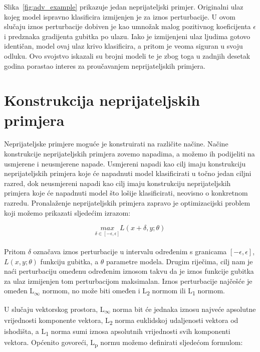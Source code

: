 \documentclass[times, utf8, zavrsni, numeric]{fer}
\begin{document}
Slika~\ref{fig:adv_example} prikazuje jedan neprijateljski primjer.
Originalni ulaz kojeg model ispravno klasificira izmijenjen je za iznos perturbacije.
U ovom slučaju iznos perturbacije dobiven je kao umnožak malog pozitivnog koeficijenta $\epsilon$ i predznaka gradijenta gubitka po ulazu.
Iako je izmijenjeni ulaz ljudima gotovo identičan, model ovaj ulaz krivo klasificira, a pritom je veoma siguran u svoju odluku.
Ovo svojstvo iskazali su brojni modeli te je zbog toga u zadnjih desetak godina porastao interes za proučavanjem neprijateljskih primjera.

\section{Konstrukcija neprijateljskih primjera}

Neprijateljske primjere moguće je konstruirati na različite načine. 
Načine konstrukcije neprijateljskih primjera zovemo napadima, a možemo ih podijeliti na usmjerene i neusmjerene napade.
Usmjereni napadi kao cilj imaju konstrukciju neprijateljskih primjera koje će napadnuti model klasificirati u točno jedan ciljni razred,
dok neusmjereni napadi kao cilj imaju konstrukciju neprijateljskih primjera koje će napadnuti model što lošije klasificirati, neovisno o konkretnom razredu.
Pronalaženje neprijateljskih primjera zapravo je optimizacijski problem koji možemo prikazati sljedećim izrazom:

\begin{equation}
    \underset{\delta \in [-\epsilon, \epsilon]}{max}L(x + \delta,y;\theta)
    \label{eq:adversarial_optimization}
\end{equation}
\\
Pritom $\delta$ označava iznos perturbacije u intervalu određenim s granicama $[-\epsilon, \epsilon]$, $L(x,y;\theta)$ funkciju gubitka, a $\theta$ parametre modela.
Drugim riječima, cilj nam je naći perturbaciju omeđenu određenim iznosom takvu da je iznos funkcije gubitka za ulaz izmijenjen tom perturbacijom maksimalan.
Iznos perturbacije najčešće je omeđen L\textsubscript{$\infty$} normom, no može biti omeđen i L\textsubscript{2} normom ili L\textsubscript{1} normom. 

U slučaju vektorskog prostora, L\textsubscript{$\infty$} norma bit će jednaka iznosu najveće apsolutne vrijednosti komponente vektora, L\textsubscript{2} norma euklidskoj udaljenosti vektora od ishodišta, a L\textsubscript{1} norma sumi iznosa apsolutnih vrijednosti svih komponenti vektora.
Općenito govoreći, L\textsubscript{p} normu možemo definirati sljedećom formulom:
\end{document}
